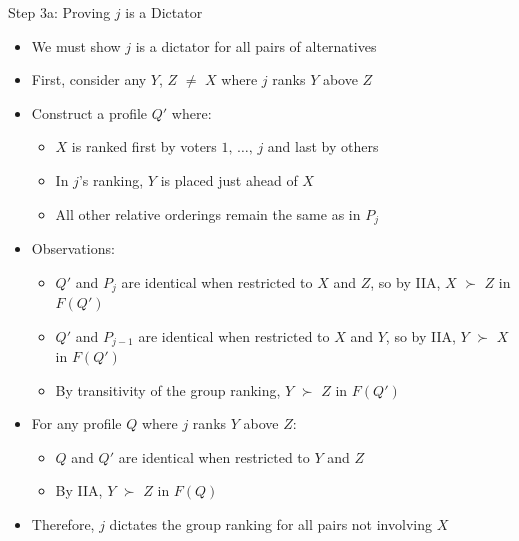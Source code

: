 \documentclass[10pt]{beamer}
\begin{document}
\begin{frame}{Step 3a: Proving $j$ is a Dictator}
  \begin{itemize}[<+->]
    \item We must show $j$ is a dictator for all pairs of alternatives
    \item First, consider any $Y$, $Z$ $\neq$ $X$ where $j$ ranks $Y$ above $Z$
    \item Construct a profile $Q'$ where:
      \begin{itemize}
        \item $X$ is ranked first by voters $1,\,\ldots,\,j$ and last by others
        \item In $j$'s ranking, $Y$ is placed just ahead of $X$
        \item All other relative orderings remain the same as in $P_j$
      \end{itemize}
    \item Observations:
      \begin{itemize}
        \item $Q'$ and $P_j$ are identical when restricted to $X$ and $Z$, so by IIA, $X$ $\succ$ $Z$ in $F(Q')$
        \item $Q'$ and $P_{j-1}$ are identical when restricted to $X$ and $Y$, so by IIA, $Y$ $\succ$ $X$ in $F(Q')$
        \item By transitivity of the group ranking, $Y$ $\succ$ $Z$ in $F(Q')$
      \end{itemize}
    \item For any profile $Q$ where $j$ ranks $Y$ above $Z$:
      \begin{itemize}
        \item $Q$ and $Q'$ are identical when restricted to $Y$ and $Z$
        \item By IIA, $Y$ $\succ$ $Z$ in $F(Q)$
      \end{itemize}
    \item Therefore, $j$ dictates the group ranking for all pairs not involving $X$
  \end{itemize}
\end{frame}
\end{document}
